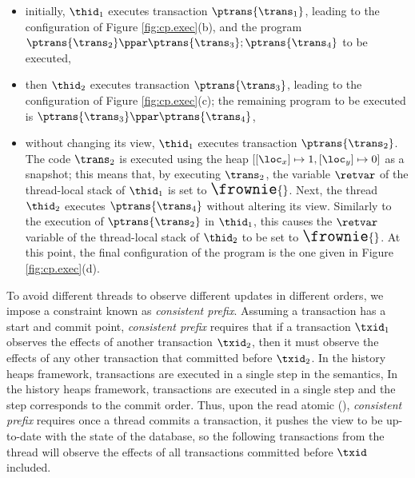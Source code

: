 \begin{itemize}
\item initially, $\thid_1$ executes transaction $\ptrans{\trans_1}$, 
leading to the configuration of Figure \ref{fig:cp.exec}(b), and the program 
$\ptrans{\trans_2} \ppar \ptrans{\trans_3} ; \ptrans{\trans_4}$ to be 
executed, 
\item then $\thid_2$ executes transaction $\ptrans{\trans_3}$, leading 
to the configuration of Figure \ref{fig:cp.exec}(c); the remaining 
program to be executed is $\ptrans{\trans_3} \ppar \ptrans{\trans_4}$, 
\item without changing its view, $\thid_1$ executes transaction $\ptrans{\trans_2}$. 
The code $\trans_2$ is executed using the heap $[ [\loc_x] \mapsto 1, [\loc_y] \mapsto 0]$ 
as a snapshot; this means that, by executing $\trans_2$, the variable $\retvar$ of the thread-local 
stack of $\thid_1$ is set to ${\Large \frownie{}}$. Next, the thread $\thid_2$ executes $\ptrans{\trans_4}$ 
without altering its view. Similarly to the execution of $\ptrans{\trans_2}$ in $\thid_1$, this causes the 
$\retvar$ variable of the thread-local stack of $\thid_2$ to be set to ${\Large \frownie{}}$. At this point, 
the final configuration of the program is the one given in Figure \ref{fig:cp.exec}(d).
\end{itemize}

To avoid different threads to observe different updates in different orders, we impose a constraint known as \emph{consistent prefix}.
Assuming a transaction has a start and commit point, \emph{consistent prefix} requires that if a transaction $\txid_1$ observes the effects of another transaction $\txid_2$, then it must observe the effects of any other transaction that committed before $\txid_2$.
In the history heaps framework, transactions are executed in a single step in the semantics,
In the history heaps framework, transactions are executed in a single step and the step corresponds to the commit order.
Thus, upon the read atomic (), \emph{consistent prefix} requires once a thread commits a transaction, it pushes the view to be up-to-date with the state of the database, so the following transactions from the thread will observe the effects of all transactions committed before \( \txid \) included.

